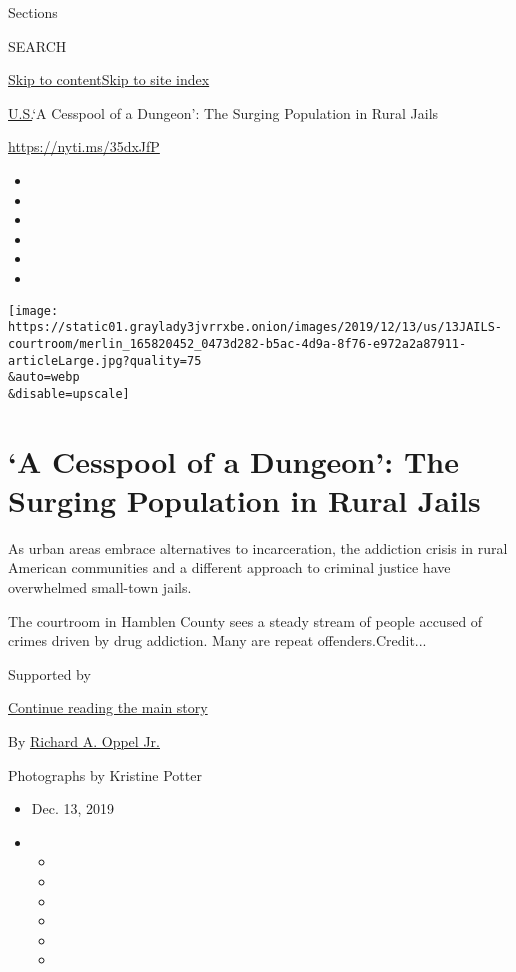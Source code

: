 Sections

SEARCH

\protect\hyperlink{site-content}{Skip to
content}\protect\hyperlink{site-index}{Skip to site index}

\href{/section/us}{U.S.}\textbar{}`A Cesspool of a Dungeon': The Surging
Population in Rural Jails

\url{https://nyti.ms/35dxJfP}

\begin{itemize}
\item
\item
\item
\item
\item
\item
\end{itemize}

\texttt{[image: https://static01.graylady3jvrrxbe.onion/images/2019/12/13/us/13JAILS-courtroom/merlin\_165820452\_0473d282-b5ac-4d9a-8f76-e972a2a87911-articleLarge.jpg?quality=75\\\&auto=webp\\\&disable=upscale]}

\hypertarget{a-cesspool-of-a-dungeon-the-surging-population-in-rural-jails}{%
\section{`A Cesspool of a Dungeon': The Surging Population in Rural
Jails}\label{a-cesspool-of-a-dungeon-the-surging-population-in-rural-jails}}

As urban areas embrace alternatives to incarceration, the addiction
crisis in rural American communities and a different approach to
criminal justice have overwhelmed small-town jails.

The courtroom in Hamblen County sees a steady stream of people accused
of crimes driven by drug addiction. Many are repeat offenders.Credit...

Supported by

\protect\hyperlink{after-sponsor}{Continue reading the main story}

By
\href{https://www.nytimes3xbfgragh.onion/by/richard-a-oppel-jr}{Richard
A. Oppel Jr.}

Photographs by Kristine Potter

\begin{itemize}
\item
  Dec. 13, 2019
\item
  \begin{itemize}
  \item
  \item
  \item
  \item
  \item
  \item
  \end{itemize}
\end{itemize}

